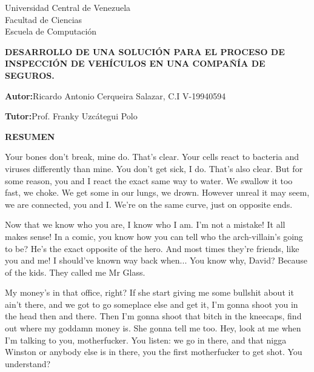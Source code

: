 
\begin{center}
	Universidad Central de Venezuela\\
	Facultad de Ciencias\\
	Escuela de Computación\\
	
\end{center}

\begin{center}
	\textbf{ DESARROLLO DE UNA SOLUCIÓN PARA EL PROCESO DE INSPECCIÓN DE VEHÍCULOS EN UNA COMPAÑÍA DE SEGUROS. }
\end{center}

\begin{flushright}
\textbf{Autor:}Ricardo Antonio Cerqueira Salazar, C.I V-19940594
\end{flushright}

\begin{flushright}
\textbf{Tutor:}Prof. Franky Uzcátegui Polo
\end{flushright}


\begin{center}
	\large{\textbf{RESUMEN}}
\end{center}

\justify

Your bones don't break, mine do. That's clear. Your cells react to bacteria and viruses differently than mine. You don't get sick, I do. That's also clear. But for some reason, you and I react the exact same way to water. We swallow it too fast, we choke. We get some in our lungs, we drown. However unreal it may seem, we are connected, you and I. We're on the same curve, just on opposite ends.

Now that we know who you are, I know who I am. I'm not a mistake! It all makes sense! In a comic, you know how you can tell who the arch-villain's going to be? He's the exact opposite of the hero. And most times they're friends, like you and me! I should've known way back when... You know why, David? Because of the kids. They called me Mr Glass.

My money's in that office, right? If she start giving me some bullshit about it ain't there, and we got to go someplace else and get it, I'm gonna shoot you in the head then and there. Then I'm gonna shoot that bitch in the kneecaps, find out where my goddamn money is. She gonna tell me too. Hey, look at me when I'm talking to you, motherfucker. You listen: we go in there, and that nigga Winston or anybody else is in there, you the first motherfucker to get shot. You understand?

